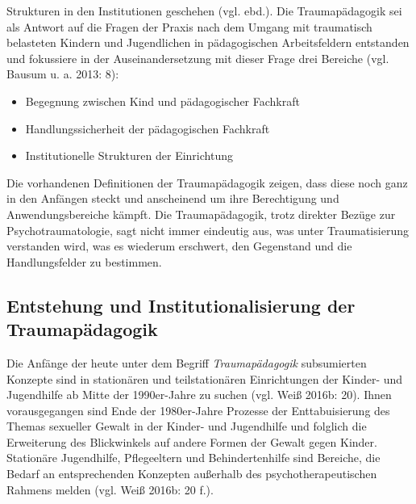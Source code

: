 Strukturen in den Institutionen geschehen (vgl. ebd.). Die Traumapädagogik sei als Antwort auf die Fragen der Praxis nach dem Umgang mit traumatisch belasteten Kindern und Jugendlichen in pädagogischen Arbeitsfeldern entstanden und fokussiere in der Auseinandersetzung mit dieser Frage drei Bereiche (vgl. Bausum u. a. 2013: 8):

\begin{itemize}
\item Begegnung zwischen Kind und pädagogischer Fachkraft 
\item Handlungssicherheit der pädagogischen Fachkraft 
\item Institutionelle Strukturen der Einrichtung
\end{itemize}

Die vorhandenen Definitionen der Traumapädagogik zeigen, dass diese noch ganz in den Anfängen steckt und anscheinend um ihre Berechtigung und Anwendungsbereiche kämpft. Die Traumapädagogik, trotz direkter Bezüge zur Psychotraumatologie, sagt nicht immer eindeutig aus, was unter Traumatisierung verstanden wird, was es wiederum erschwert, den Gegenstand und die Handlungsfelder zu bestimmen.

\subsection{Entstehung und Institutionalisierung der Traumapädagogik}
Die Anfänge der heute unter dem Begriff \textit{Traumapädagogik} subsumierten Konzepte sind in stationären und teilstationären Einrichtungen der Kinder- und Jugendhilfe ab Mitte der 1990er-Jahre zu suchen (vgl. Weiß 2016b: 20). Ihnen vorausgegangen sind Ende der 1980er-Jahre Prozesse der Enttabuisierung des Themas sexueller Gewalt in der Kinder- und Jugendhilfe und folglich die Erweiterung des Blickwinkels auf andere Formen der Gewalt gegen Kinder. Stationäre Jugendhilfe, Pflegeeltern und Behindertenhilfe sind Bereiche, die Bedarf an entsprechenden Konzepten außerhalb des psychotherapeutischen Rahmens melden (vgl. Weiß 2016b: 20 f.).

